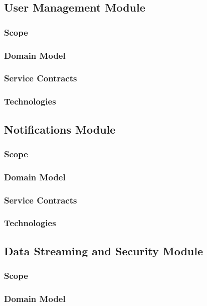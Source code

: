 \documentclass{article}
\begin{document}
				

	\subsection{User Management Module}
		\subsubsection{Scope}
		\subsubsection{Domain Model}
		\subsubsection{Service Contracts}
		\subsubsection{Technologies}
		
	\subsection{Notifications Module}
		\subsubsection{Scope}
		\subsubsection{Domain Model}
		\subsubsection{Service Contracts}
		\subsubsection{Technologies}
		
	\subsection{Data Streaming and Security Module}
		\subsubsection{Scope}
		\subsubsection{Domain Model}
\end{document}
